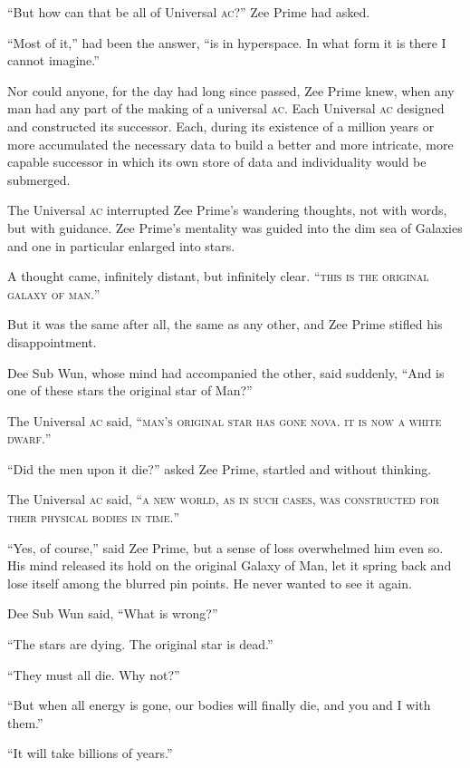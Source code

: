 \enquote{But how can that be all of Universal \textsc{ac}?} Zee Prime had asked.

\enquote{Most of it,} had been the answer, \enquote{is in hyperspace. In what form it is there I cannot imagine.}

Nor could anyone, for the day had long since passed, Zee Prime knew, when any man had any part of the making of a universal \textsc{ac}. Each Universal \textsc{ac} designed and constructed its successor. Each, during its existence of a million years or more accumulated the necessary data to build a better and more intricate, more capable successor in which its own store of data and individuality would be submerged.

The Universal \textsc{ac} interrupted Zee Prime's wandering thoughts, not with words, but with guidance. Zee Prime's mentality was guided into the dim sea of Galaxies and one in particular enlarged into stars.

A thought came, infinitely distant, but infinitely clear. \enquote{\textsc{this is the original galaxy of man.}}

But it was the same after all, the same as any other, and Zee Prime stifled his disappointment.

Dee Sub Wun, whose mind had accompanied the other, said suddenly, \enquote{And is one of these stars the original star of Man?}

The Universal \textsc{ac} said, \enquote{\textsc{man's original star has gone nova. it is now a white dwarf.}}

\enquote{Did the men upon it die?} asked Zee Prime, startled and without thinking.

The Universal \textsc{ac} said, \enquote{\textsc{a new world, as in such cases, was constructed for their physical bodies in time.}}

\enquote{Yes, of course,} said Zee Prime, but a sense of loss overwhelmed him even so. His mind released its hold on the original Galaxy of Man, let it spring back and lose itself among the blurred pin points. He never wanted to see it again.

Dee Sub Wun said, \enquote{What is wrong?}

\enquote{The stars are dying. The original star is dead.}

\enquote{They must all die. Why not?}

\enquote{But when all energy is gone, our bodies will finally die, and you and I with them.}

\enquote{It will take billions of years.}

